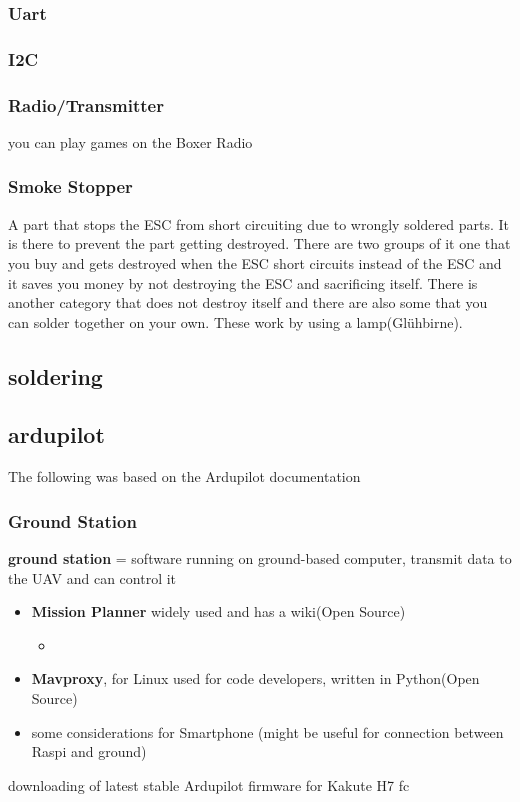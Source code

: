 \documentclass{article}
\begin{document}
	\subsubsection*{Uart}
	\subsubsection*{I2C}
	
	\subsubsection{Radio/Transmitter}
	you can play games on the Boxer Radio
		

	\subsubsection{Smoke Stopper}
	A part that stops the ESC from short circuiting due to wrongly soldered parts. It is there to prevent the part getting destroyed. There are two groups of it one that you buy and gets destroyed when the ESC short circuits instead of the ESC and it saves you money by not destroying the ESC and sacrificing itself. There is another category that does not destroy itself and there are also some that you can solder together on your own. These work by using a lamp(Glühbirne).
	
	
	
	\subsection{soldering}
	
	\subsection{ardupilot}
	The following was based on the Ardupilot documentation
	\subsubsection{Ground Station}
	\textbf{ground station} = software running on ground-based computer, transmit data to the UAV and can control it
	\begin{itemize}
		\item \textbf{Mission Planner} \cite{MissionPlanner} widely used and has a wiki(Open Source)
		\begin{itemize}
			\item 
		\end{itemize}
		\item \textbf{Mavproxy}, for Linux used for code developers, written in Python(Open Source)
		\item some considerations for Smartphone (might be useful for connection between Raspi and ground)
	\end{itemize}
	downloading of latest stable Ardupilot firmware \cite{ArduPilotFirmware} for Kakute H7 fc	
	
\end{document}
